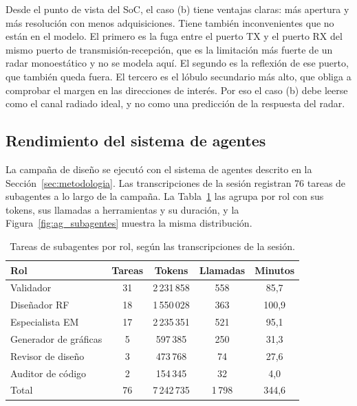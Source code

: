 \documentclass[11pt,a4paper]{article}
\begin{document}
Desde el punto de vista del SoC, el caso (b) tiene ventajas claras: más apertura y más resolución
con menos adquisiciones. Tiene también inconvenientes que no están en el modelo. El primero es la
fuga entre el puerto TX y el puerto RX del mismo puerto de transmisión-recepción, que es la limitación
más fuerte de un radar monoestático y no se modela aquí. El segundo es la reflexión de ese puerto, que
también queda fuera. El tercero es el lóbulo secundario más alto, que obliga a comprobar el margen en
las direcciones de interés. Por eso el caso (b) debe leerse como el canal radiado ideal, y no como una
predicción de la respuesta del radar.

\subsection{Rendimiento del sistema de agentes}\label{sec:rendimiento_agentes}
La campaña de diseño se ejecutó con el sistema de agentes descrito en la Sección~\ref{sec:metodologia}.
Las transcripciones de la sesión registran 76 tareas de subagentes a lo largo de la campaña.
La Tabla~\ref{tab:uso_agentes} las agrupa por rol con sus tokens, sus llamadas a herramientas y su
duración, y la Figura~\ref{fig:ag_subagentes} muestra la misma distribución.

\begin{table}[H]
    \centering
    \caption{Tareas de subagentes por rol, según las transcripciones
    de la sesión.}
    \label{tab:uso_agentes}
    \begin{tabularx}{\textwidth}{X c c c c}
        \toprule
        Rol & Tareas & Tokens & Llamadas & Minutos \\
        \midrule
        Validador & 31 & 2\,231\,858 & 558 & 85,7 \\
        Diseñador RF & 18 & 1\,550\,028 & 363 & 100,9 \\
        Especialista EM & 17 & 2\,235\,351 & 521 & 95,1 \\
        Generador de gráficas & 5 & 597\,385 & 250 & 31,3 \\
        Revisor de diseño & 3 & 473\,768 & 74 & 27,6 \\
        Auditor de código & 2 & 154\,345 & 32 & 4,0 \\
        \midrule
        Total & 76 & 7\,242\,735 & 1\,798 & 344,6 \\
        \bottomrule
    \end{tabularx}
\end{table}
\end{document}
